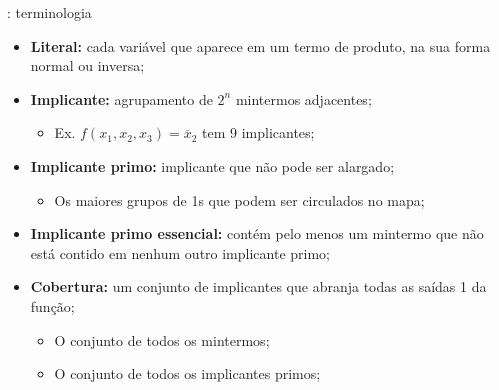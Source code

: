 \begin{frame}{\insertsection: terminologia}
    \begin{itemize}
        \item<1-> \textbf{Literal:} cada variável que aparece em um termo de produto, na sua forma normal ou inversa; 
        \item<2-> \textbf{Implicante:} agrupamento de $2^n$ mintermos adjacentes; 
        \begin{itemize}
            \item Ex. $f(x_1,x_2,x_3)=\overline{x}_2$ tem 9 implicantes;
        \end{itemize}
        \item<8-> \textbf{Implicante primo:} implicante que não pode ser alargado;
        \begin{itemize}
            \item Os maiores grupos de 1s que podem ser circulados no mapa;
        \end{itemize}
        \item<9-> \textbf{Implicante primo essencial:} contém pelo menos um mintermo que
não está contido em nenhum outro implicante primo; 
        \item<10-> \textbf{Cobertura:} um conjunto de implicantes que abranja todas as saídas 1 da função; 
        \begin{itemize}
            \item O conjunto de todos os mintermos;
            \item O conjunto de todos os implicantes primos; 
        \end{itemize}
    \end{itemize}
    \vspace{-3cm}
\end{frame}

